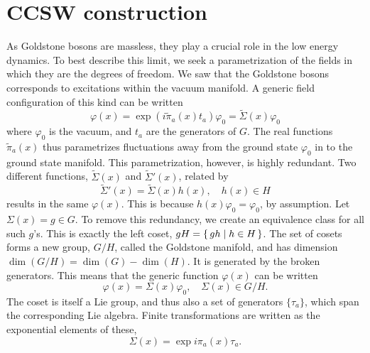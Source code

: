 \section{CCSW construction}

As Goldstone bosons are massless, they play a crucial role in the low energy dynamics.
To best describe this limit, we seek a parametrization of the fields in which they are the degrees of freedom.
We saw that the Goldstone bosons corresponds to excitations within the vacuum manifold.
A generic field configuration of this kind can be written
\begin{equation}
    \varphi(x) = \exp(i \tilde\pi_a(x) t_a) \varphi_0 = \tilde\Sigma(x) \varphi_0
\end{equation}
where $\varphi_0$ is the vacuum, and $t_a$ are the generators of $G$.
The real functions $\tilde\pi_a(x)$ thus parametrizes fluctuations away from the ground state $\varphi_0$ in to the ground state manifold.
This parametrization, however, is highly redundant.
Two different functions, $\tilde\Sigma(x)$ and $\tilde\Sigma'(x)$, related by 
\begin{equation}
    \tilde \Sigma'(x) = \tilde\Sigma(x) h(x), \quad h(x) \in H
\end{equation}
results in the same $\varphi(x)$.
This is because $h(x)\varphi_0 = \varphi_0$, by assumption.
Let $\Sigma(x) = g \in G$.
To remove this redundancy, we create an equivalence class for all such $g$'s.
This is exactly the left coset, $gH = \left\{\, gh \mid  h \in H \,\right\}$.
The set of cosets forms a new group, $G / H$, called the Goldstone manifold, and has dimension $\dim(G/H) = \dim(G) - \dim(H)$.
It is generated by the broken generators.
This means that the generic function $\varphi(x)$ can be written
\begin{equation*}
    \varphi(x) = \Sigma(x)\varphi_0, \quad \Sigma(x) \in G/H.
\end{equation*}
The coset is itself a Lie group, and thus also a set of generators $\{\tau_a\}$, which span the corresponding Lie algebra.
Finite transformations are written as the exponential elements of these,
\begin{equation}
    \Sigma(x) = \exp{i \pi_a(x) \tau_a}.
\end{equation}

